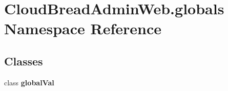 \hypertarget{namespace_cloud_bread_admin_web_1_1globals}{}\section{Cloud\+Bread\+Admin\+Web.\+globals Namespace Reference}
\label{namespace_cloud_bread_admin_web_1_1globals}
\subsection*{Classes}
\begin{DoxyCompactItemize}
\item 
class {\bfseries global\+Val}
\end{DoxyCompactItemize}
